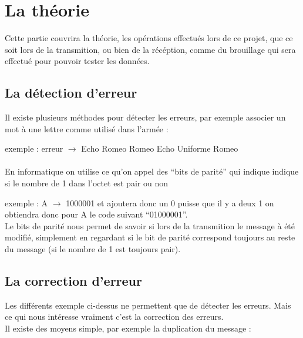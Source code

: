 
\section{La théorie}
\label{sec:theorie}

Cette partie couvrira la théorie, les opérations effectués lors de ce projet, que ce soit lors de la transmition, ou bien de la récéption, comme du brouillage qui sera effectué pour pouvoir tester les données.

\subsection{La détection d'erreur}
\label{sub:La détection d'erreur}

Il existe plusieurs méthodes pour détecter les erreurs, par exemple associer un mot à une lettre comme utilisé dans l'armée :

\hspace{1cm} exemple : erreur $\rightarrow$ Echo Romeo Romeo Echo Uniforme Romeo
\\
\\ En informatique on utilise ce qu'on appel des ``bits de parité'' qui indique indique si le nombre de 1 dans l'octet est pair ou non

\hspace{1cm} exemple : A $\rightarrow$ 1000001 et ajoutera donc un 0 puisse que il y a deux 1 on obtiendra donc pour A le code suivant ``01000001''.
\\ Le bits de parité nous permet de savoir si lors de la transmition le message à été modifié, simplement en regardant si le bit de parité correspond toujours au reste du message (si le nombre de 1 est toujours pair).

\subsection{La correction d'erreur}
\label{sub:La correction d'erreur}

Les différents exemple ci-dessus ne permettent que de détecter les erreurs. Mais ce qui nous intéresse vraiment c'est la correction des erreurs.
\\ Il existe des moyens simple, par exemple la duplication du message :

